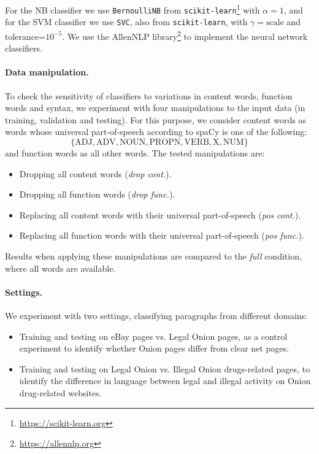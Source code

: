 \documentclass[11pt,a4paper,table]{article}
\begin{document}
For the NB classifier we use \texttt{BernoulliNB} from
\texttt{scikit-learn}\footnote{\url{https://scikit-learn.org}}
with $\alpha=1$,
and for the SVM classifier we use \texttt{SVC}, also from \texttt{scikit-learn},
with $\gamma=\mathrm{scale}$ and tolerance=$10^{-5}$.
We use the AllenNLP  library\footnote{\url{https://allennlp.org}}
\cite{Gardner2017AllenNLP} to implement the neural network classifiers.

\paragraph{Data manipulation.}

To check the sensitivity of classifiers to variations in content words,
function words and syntax, we experiment with four manipulations to the input
data (in training, validation and testing).
For this purpose, we consider content words as words whose universal part-of-speech
according to spaCy is one of the following:
\[\{\mathrm{ADJ, ADV, NOUN, PROPN, VERB, X, NUM}\}\]
and function words as all other words.
The tested manipulations are:

\begin{itemize}
  \item Dropping all content words ({\it drop cont.}).
  \item Dropping all function words ({\it drop func.}).
  \item Replacing all content words with their universal part-of-speech ({\it pos cont.}).
  \item Replacing all function words with their universal part-of-speech ({\it pos func.}).
\end{itemize}

Results when applying these manipulations are compared to the {\it full} condition, where all
words are available.

\paragraph{Settings.}

We experiment with two settings, classifying paragraphs from different domains:
\begin{itemize}
  \item Training and testing on eBay pages vs. Legal Onion pages,
  as a control experiment
  to identify whether Onion pages differ from clear net pages.
  \item Training and testing on Legal Onion vs. Illegal Onion drugs-related pages,
  to identify the difference in language between legal and illegal activity
  on Onion drug-related websites.
  
\end{itemize}
\end{document}

